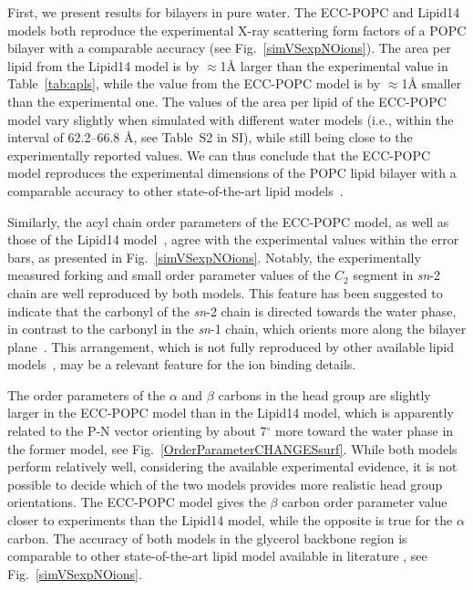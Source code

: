  
First, we present results for bilayers in pure water. 
The ECC-POPC and Lipid14 models both reproduce the experimental X-ray scattering form factors 
of a POPC bilayer with a comparable accuracy (see Fig.~\ref{simVSexpNOions}). 
The area per lipid from the Lipid14 model is by $\approx$1Å larger than the 
experimental value in Table~\ref{tab:apls}, while the value from the ECC-POPC model 
is by $\approx$1Å smaller than the experimental one. 
The values of the area per lipid of the ECC-POPC model vary slightly 
when simulated with different water models (i.e., within the interval of 62.2--66.8 Å, see Table~S2 in SI), 
while still being close to the experimentally reported values. 
We can thus conclude that the ECC-POPC model reproduces the experimental dimensions of the POPC 
lipid bilayer with a comparable accuracy to other state-of-the-art lipid models~\citep{ollila16}. 
 
 
Similarly, the acyl chain order parameters of the ECC-POPC model, as well as those of the Lipid14 model~\citep{dickson14}, agree with the experimental values within the error bars, as presented in Fig.~\ref{simVSexpNOions}. Notably, the experimentally measured forking and small order parameter values of the $C_2$ segment in {\it sn}-2 chain are well reproduced by both models. This feature has been suggested to indicate that the carbonyl of the {\it sn}-2 chain is directed towards the water phase, in contrast to the carbonyl in the {\it sn}-1 chain, which orients more along the bilayer plane~\citep{seelig75,schindler75,gawrisch92}. 
This arrangement, which is not fully reproduced by other available lipid models~\citep{ollila16}, may be a relevant feature for the ion binding details. 
 
The order parameters of the $\alpha$ and $\beta$ carbons in the head group are slightly larger in the ECC-POPC model than in the Lipid14 model, which is apparently related to the P-N vector orienting by about 7$^{\circ}$ more toward the water phase in the former model, see Fig.~\ref{OrderParameterCHANGESsurf}. While both models perform relatively well, considering the available experimental evidence, it is not possible to decide which of the two models provides more realistic head group orientations. The ECC-POPC model gives the $\beta$ carbon order parameter value closer to experiments than the Lipid14 model, while the opposite is true for the $\alpha$ carbon. The accuracy of both models in the glycerol backbone region is comparable to other state-of-the-art lipid model available in literature \citep{botan15}, see Fig.~\ref{simVSexpNOions}. 


 
 
